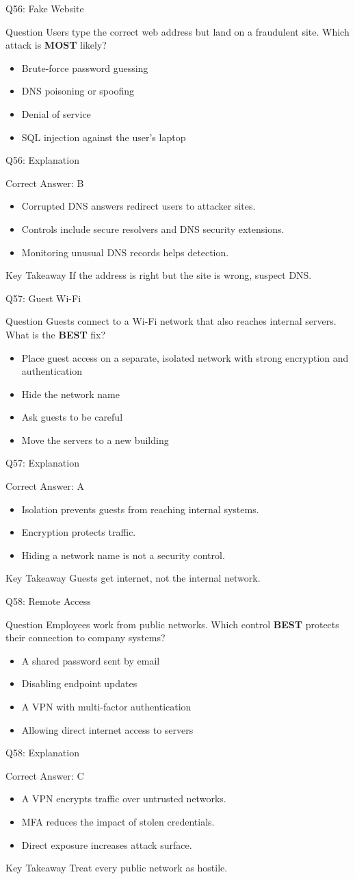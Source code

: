 \documentclass[aspectratio=169]{beamer}
\newcommand{\hq}[7]{%
	\begin{frame}{Q#1: #2}
		\begin{block}{Question}
			#3
		\end{block}
		\begin{itemize}
			#4
		\end{itemize}
	\end{frame}
	\begin{frame}{Q#1: Explanation}
		\begin{block}{Correct Answer: #5}
			\begin{itemize}
				#6
			\end{itemize}
		\end{block}
		\begin{alertblock}{Key Takeaway}
			#7
		\end{alertblock}
	\end{frame}
}
\begin{document}
	\hq{56}{Fake Website}
	{Users type the correct web address but land on a fraudulent site. Which attack is \textbf{MOST} likely?}
	{\item[\textbf{(A)}] Brute-force password guessing
		\item[\textbf{(B)}] DNS poisoning or spoofing
		\item[\textbf{(C)}] Denial of service
		\item[\textbf{(D)}] SQL injection against the user's laptop}
	{B}
	{\item Corrupted DNS answers redirect users to attacker sites.
		\item Controls include secure resolvers and DNS security extensions.
		\item Monitoring unusual DNS records helps detection.}
	{If the address is right but the site is wrong, suspect DNS.}
	
	\hq{57}{Guest Wi-Fi}
	{Guests connect to a Wi-Fi network that also reaches internal servers. What is the \textbf{BEST} fix?}
	{\item[\textbf{(A)}] Place guest access on a separate, isolated network with strong encryption and authentication
		\item[\textbf{(B)}] Hide the network name
		\item[\textbf{(C)}] Ask guests to be careful
		\item[\textbf{(D)}] Move the servers to a new building}
	{A}
	{\item Isolation prevents guests from reaching internal systems.
		\item Encryption protects traffic.
		\item Hiding a network name is not a security control.}
	{Guests get internet, not the internal network.}
	
	\hq{58}{Remote Access}
	{Employees work from public networks. Which control \textbf{BEST} protects their connection to company systems?}
	{\item[\textbf{(A)}] A shared password sent by email
		\item[\textbf{(B)}] Disabling endpoint updates
		\item[\textbf{(C)}] A VPN with multi-factor authentication
		\item[\textbf{(D)}] Allowing direct internet access to servers}
	{C}
	{\item A VPN encrypts traffic over untrusted networks.
		\item MFA reduces the impact of stolen credentials.
		\item Direct exposure increases attack surface.}
	{Treat every public network as hostile.}
	
\end{document}
